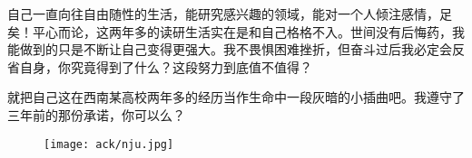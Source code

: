 \begin{thanks}
自己一直向往自由随性的生活，能研究感兴趣的领域，能对一个人倾注感情，足矣！平心而论，这两年多的读研生活实在是和自己格格不入。世间没有后悔药，我能做到的只是不断让自己变得更强大。我不畏惧困难挫折，但奋斗过后我必定会反省自身，你究竟得到了什么？这段努力到底值不值得？

就把自己这在西南某高校两年多的经历当作生命中一段灰暗的小插曲吧。我遵守了三年前的那份承诺，你可以么？

\begin{figure}[!htbp]
  \centering
  \texttt{[image: ack/nju.jpg]}
\end{figure}
\fi

\end{thanks}
